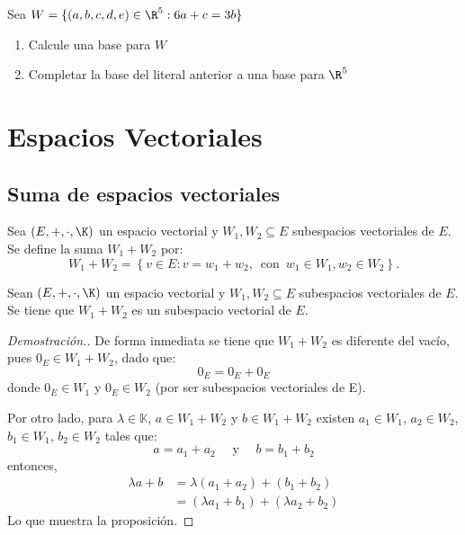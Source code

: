 \documentclass[compacto,10pt]{pubciencias-notas}
\begin{document}
\begin{ejer}\hspace{0pt}
\item
    Sea $W = \{(a,b,c,d,e) \in \R^5 : 6a+c=3b\}$
    \begin{enumerate}
    \item
        Calcule una base para $W$
    \item
        Completar la base del literal anterior a una base para $\R^5$
    
    \end{enumerate}
\end{ejer}

\setcounter{section}{3}
\section{Espacios Vectoriales}
\setcounter{subsection}{7}
\subsection{Suma de espacios vectoriales}

\begin{defi}
    Sea $(E,+,\cdot,\K)$ un espacio vectorial y $W_1,W_2\subseteq E$ subespacios vectoriales de $E$. Se define la suma $W_1+W_2$ por:
    \[
        W_1 + W_2 =\left\{v\in E: v=w_1+w_2, \, \text{ con }\, w_1\in W_1, w_2\in W_2\right\}. 
    \]
\end{defi}
\begin{prop}
    Sean $(E,+,\cdot,\K)$ un espacio vectorial y $W_1,W_2\subseteq E$ subespacios vectoriales de $E$. Se tiene que $W_1 + W_2$ es un subespacio vectorial de $E$.
\end{prop}

\begin{proof}[Demostración.]\hspace{0pt} De forma inmediata se tiene que $W_1+W_2$ es diferente del vacío, pues $0_E\in W_1+W_2$, dado que:
\[0_E = 0_E + 0_E\]
donde $0_E\in W_1$ y $0_E\in W_2$ (por ser subespacios vectoriales de E).\newline

Por otro lado, para $\lambda\in\mathbb{K}$, $a\in W_1+W_2$ y $b\in W_1+W_2$ existen $a_1\in W_1$, $a_2\in W_2$, $b_1\in W_1$, $b_2\in W_2$ tales que:
\[
a = a_1 + a_2\quad \text{ y }\quad b = b_1 + b_2
\]
entonces,
\begin{align*}
    \lambda a + b &= \lambda(a_1+a_2) + (b_1+b_2)\\
                  &= (\lambda a_1 + b_1) + (\lambda a_2 + b_2)
\end{align*}    
Lo que muestra la proposición.
\end{proof}
\end{document}
